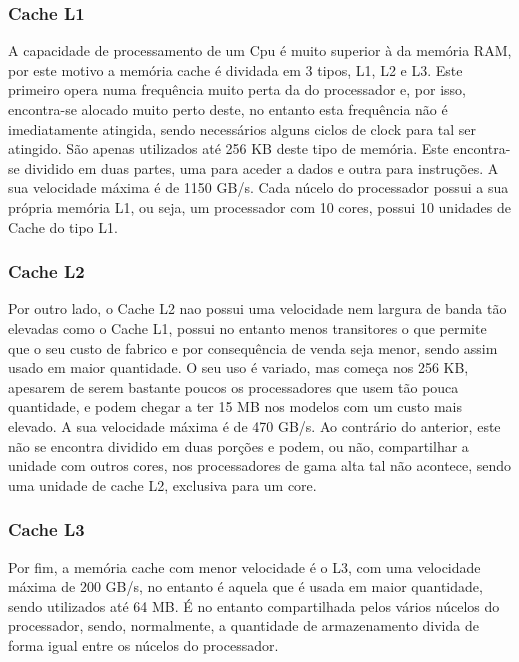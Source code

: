 \documentclass{report}
\begin{document}
\subsubsection{Cache L1}
\label{cache l1}
\par A capacidade de processamento de um \ac{Cpu} é muito superior à da memória \ac{RAM}, por este motivo a memória cache é dividada em 3 tipos, L1, L2 e L3. Este primeiro opera numa frequência muito perta da do processador e, por isso, encontra-se alocado muito perto deste, no entanto esta frequência não é imediatamente atingida, sendo necessários alguns ciclos de clock para tal ser atingido. São apenas utilizados até 256 KB deste tipo de memória. Este encontra-se dividido em duas partes, uma para aceder a dados e outra para instruções. A sua velocidade máxima é de 1150 GB/s. Cada núcelo do processador possui a sua própria memória L1, ou seja, um processador com 10 cores, possui 10 unidades de Cache do tipo L1. 
\subsubsection{Cache L2}
\label{cache l2}
\par Por outro lado, o Cache L2 nao possui uma velocidade nem largura de banda tão elevadas como o Cache L1, possui no entanto menos transitores o que permite que o seu custo de fabrico e por consequência de venda seja menor, sendo assim usado em maior quantidade. O seu uso é variado, mas começa nos 256 KB, apesarem de serem bastante poucos os processadores que usem tão pouca quantidade, e podem chegar a ter 15 MB nos modelos com um custo mais elevado. A sua velocidade máxima é de 470 GB/s. Ao contrário do anterior, este não se encontra dividido em duas porções e podem, ou não, compartilhar a unidade com outros cores, nos processadores de gama alta tal não acontece, sendo uma unidade de cache L2, exclusiva para um core.
\subsubsection{Cache L3}
\label {cache l3}
\par Por fim, a memória cache com menor velocidade é o L3, com uma velocidade máxima de 200 GB/s, no entanto é aquela que é usada em maior quantidade, sendo utilizados até 64 MB. É no entanto compartilhada pelos vários núcelos do processador, sendo, normalmente, a quantidade de armazenamento divida de forma igual entre os núcelos do processador.
\pagebreak
\end{document}
